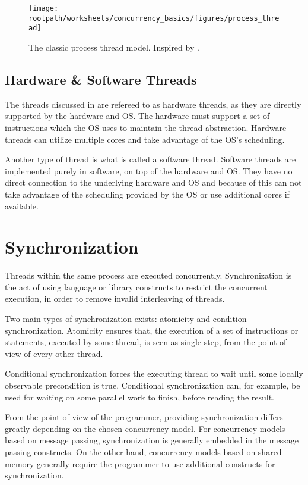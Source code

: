 \begin{figure}[htbp]
\centering
 \texttt{[image: \\rootpath/worksheets/concurrency\_basics/figures/process\_thread]} 
 \caption{The classic process thread model. Inspired by \cite[p. 99]{tanenbaum2008modern}.}
\label{fig:classic_process_thread}
\end{figure}


\subsection{Hardware \& Software Threads}
The threads discussed in  are refereed to as hardware threads, as they are directly supported by the hardware and \ac{OS}. The hardware must support a set of instructions which the \ac{OS} uses to maintain the thread abstraction. Hardware threads can utilize multiple cores and take advantage of the \ac{OS}'s scheduling.

Another type of thread is what is called a software thread. Software threads are implemented purely in software, on top of the hardware and \ac{OS}. They have no direct connection to the underlying hardware and \ac{OS} and because of this can not take advantage of the scheduling provided by the \ac{OS} or use additional cores if available. 

\section{Synchronization}\label{sec:synchronization}
Threads within the same process are executed concurrently. Synchronization is the act of using language or library constructs to restrict the concurrent execution, in order to remove invalid interleaving of threads\cite[p. 1989]{scott2011sync}.

Two main types of synchronization exists: atomicity and condition synchronization. Atomicity ensures that, the execution of a set of instructions or statements, executed by some thread, is seen as single step, from the point of view of every other thread\cite[p. 1989]{scott2011sync}.

Conditional synchronization forces the executing thread to wait until some locally observable precondition is true\cite[p. 1989]{scott2011sync}. Conditional synchronization can, for example, be used for waiting on some parallel work to finish, before reading the result.

From the point of view of the programmer, providing synchronization differs greatly depending on the chosen concurrency model. For concurrency models based on message passing, synchronization is generally embedded in the message passing constructs. On the other hand, concurrency models based on shared memory generally require the programmer to use additional constructs for synchronization\cite[p. 1989]{scott2011sync}.


